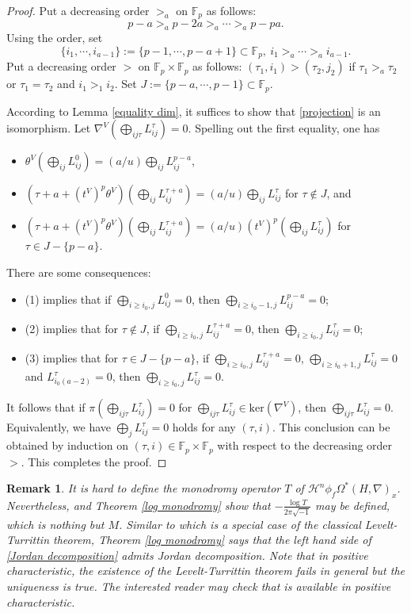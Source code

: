 \documentclass[12pt, a4paper]{article}
\newtheorem{remark}{Remark}[section]
\begin{document}
\begin{proof}
Put a decreasing order $>_a$ on $\mathbb F_p$ as follows:
$$
p-a>_ap-2a>_a\cdots>_ap-pa.
$$
Using the order, set 
$$\{i_1,\cdots,i_{a-1}\}:=\{p-1,\cdots,p-a+1\}\subset\mathbb F_p,~i_1>_a\cdots>_a i_{a-1}.$$
Put a decreasing order $>$ on $\mathbb F_p\times\mathbb F_p$ as follows: $(\tau_1,i_1)>(\tau_2,j_2)$ if $\tau_1>_a\tau_2$ or $\tau_1=\tau_2$ and $i_1>_1i_2$.  Set $J:=\{p-a,\cdots,p-1\}\subset\mathbb F_p$.

According to Lemma \ref{equality dim}, it suffices to show that \eqref{projection} is an isomorphism. Let
$\nabla^V(\bigoplus_{ij\tau}L^\tau_{ij})=0$. Spelling out the first equality, one has
\begin{itemize}
\item[(1)\ ] $\theta^V(\bigoplus_{ij}L_{ij}^0)=(a/u)\bigoplus_{ij}L^{p-a}_{ij}$,
\item[(2)\ ] $(\tau+a+(t^V)^p\theta^V)(\bigoplus_{ij}L_{ij}^{\tau+a})=(a/u)\bigoplus_{ij}L^\tau_{ij}$ for $\tau\notin J$, and
\item[(3)\ ] $(\tau+a+(t^V)^p\theta^V)(\bigoplus_{ij}L_{ij}^{\tau+a})=(a/u)(t^V)^p(\bigoplus_{ij}L^\tau_{ij})$ for $\tau\in J-\{p-a\}$.
\end{itemize}
There are some consequences:
\begin{itemize}
\item (1) implies that if $\bigoplus_{i\geq i_0,j}L^0_{ij}=0$, then $\bigoplus_{i\geq i_0-1,j}L^{p-a}_{ij}=0$;
\item (2) implies that for $\tau\notin J$, if $\bigoplus_{i\geq i_0,j}L^{\tau+a}_{ij}=0$, then $\bigoplus_{i\geq i_0,j}L^\tau_{ij}=0$;
\item (3) implies that for $\tau\in J-\{p-a\}$, if 
$\bigoplus_{i\geq i_0,j}L^{\tau+a}_{ij}=0$, $\bigoplus_{i\geq i_0+1,j}L^{\tau}_{ij}=0$ and $L^\tau_{i_0(a-2)}=0$, then $\bigoplus_{i\geq i_0,j}L^{\tau}_{ij}=0$.
\end{itemize}
It follows that if $\pi(\bigoplus_{ij\tau}L^\tau_{ij})=0$ for $\bigoplus_{ij\tau}L^\tau_{ij}\in\mathrm{ker}(\nabla^V)$, then $\bigoplus_{ij\tau}L^\tau_{ij}=0$. Equivalently, we have $\bigoplus_jL^\tau_{ij}=0$ holds for any $(\tau,i)$.
This conclusion can be obtained by induction on $(\tau,i)\in\mathbb F_p\times\mathbb F_p$ with respect to the decreasing order $>$. This completes the proof.
\end{proof}
\begin{remark}
It is hard to define the monodromy operator $T$ of $\mathcal H^n\phi_f\Omega^*(H,\nabla)_x$. Nevertheless, \cite[Introduction]{SS} and Theorem \ref{log monodromy} show that $-\frac{\log T}{2\pi\sqrt{-1}}$ may be defined, which is nothing but $M$. Similar to \cite[Theorem 1]{SS} which is a special case of the classical Levelt-Turrittin theorem, Theorem \ref{log monodromy} says that the left hand side of \eqref{Jordan decomposition} admits Jordan decomposition. Note that in positive characteristic, the existence of the Levelt-Turrittin theorem fails in general but the uniqueness is true. The interested reader may check that \cite[\S4]{Lev} is available in positive characteristic.
\end{remark}
\end{document}
